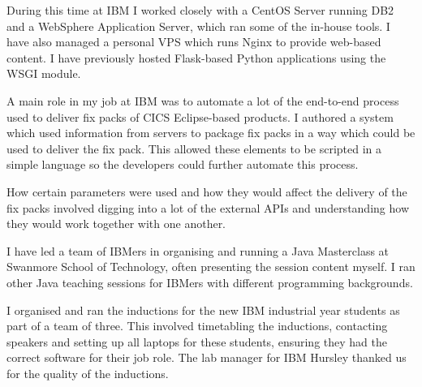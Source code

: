\documentclass[10pt,stdletter,dateno,sigleft]{newlfm} %
\begin{document}
\begin{newlfm}
During this time at IBM I worked closely with a CentOS Server running DB2 and a WebSphere 
Application Server, which ran some of the in-house tools. I have also managed a
personal VPS which runs Nginx to provide web-based content. I have previously
hosted Flask-based Python applications using the WSGI module.

A main role in my job at IBM was to automate a lot of the end-to-end process 
used to deliver fix packs of CICS Eclipse-based products. I authored a system which used
information from servers to package fix packs in a way which could be used to deliver the fix pack.
This allowed these elements to be scripted in a simple language so
the developers could further automate this process.

How certain parameters were used and how they would affect the delivery of the fix
packs involved digging into a lot of the external APIs and understanding 
how they would work together with one another.

I have led a team of IBMers in organising and running a Java Masterclass
at Swanmore School of Technology, often presenting the session content myself.
I ran other Java teaching sessions for IBMers with different programming
backgrounds.

I organised and ran the inductions for the new IBM industrial year students as
part of a team of three. This involved timetabling the inductions, contacting
speakers and setting up all laptops for these students, ensuring they had the
correct software for their job role. The lab manager for IBM Hursley 
thanked us for the quality of the inductions.




\end{newlfm}
\end{document}
